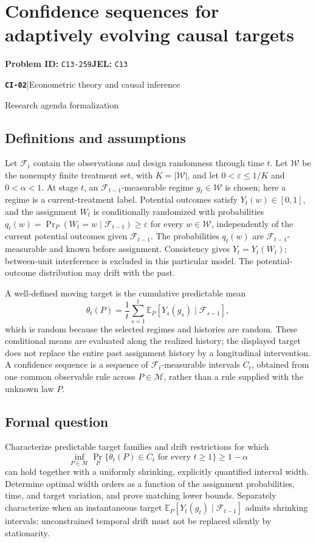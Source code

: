 \documentclass[11pt,a4paper]{article}
\newcommand{\E}{\mathbb E}
\newcommand{\entrymeta}[3]{{\sffamily\small\color{muted}\textbf{\texttt{#1}}\quad|\quad #2\par #3\par}}
\begin{document}
\section*{Confidence sequences for adaptively evolving causal targets}
\textbf{Problem ID:} \texttt{C13-259}\quad \textbf{JEL:} \texttt{C13}\par
\label{problem:OP-0481}
\label{beyond:CI-02}
\entrymeta{CI-02}{Econometric theory and causal inference}{Research agenda formalization}
\subsection*{Definitions and assumptions}
Let $\mathcal F_t$ contain the observations and design randomness through time $t$. Let $\mathcal W$ be the nonempty finite treatment set, with $K=|\mathcal W|$, and let $0<\varepsilon\leq1/K$ and $0<\alpha<1$. At stage $t$, an $\mathcal F_{t-1}$-measurable regime $g_t\in\mathcal W$ is chosen; here a regime is a current-treatment label. Potential outcomes satisfy $Y_t(w)\in[0,1]$, and the assignment $W_t$ is conditionally randomized with probabilities $q_t(w)=\Pr_P(W_t=w\mid\mathcal F_{t-1})\geq\varepsilon$ for every $w\in\mathcal W$, independently of the current potential outcomes given $\mathcal F_{t-1}$. The probabilities $q_t(w)$ are $\mathcal F_{t-1}$-measurable and known before assignment. Consistency gives $Y_t=Y_t(W_t)$; between-unit interference is excluded in this particular model. The potential-outcome distribution may drift with the past.

A well-defined moving target is the cumulative predictable mean
\[
\theta_t(P)=\frac1t\sum_{s=1}^t
 \E_P[Y_s(g_s)\mid\mathcal F_{s-1}],
\]
which is random because the selected regimes and histories are random. These conditional means are evaluated along the realized history; the displayed target does not replace the entire past assignment history by a longitudinal intervention. A confidence sequence is a sequence of $\mathcal F_t$-measurable intervals $C_t$, obtained from one common observable rule across $P\in\mathcal M$, rather than a rule supplied with the unknown law $P$.
\subsection*{Formal question}
Characterize predictable target families and drift restrictions for which
\[
\inf_{P\in\mathcal M}\Pr_P\{\theta_t(P)\in C_t
                 \text{ for every }t\geq1\}\geq1-\alpha
\]
can hold together with a uniformly shrinking, explicitly quantified interval width. Determine optimal width orders as a function of the assignment probabilities, time, and target variation, and prove matching lower bounds. Separately characterize when an instantaneous target $\E_P[Y_t(g_t)\mid\mathcal F_{t-1}]$ admits shrinking intervals: unconstrained temporal drift must not be replaced silently by stationarity.
\end{document}
